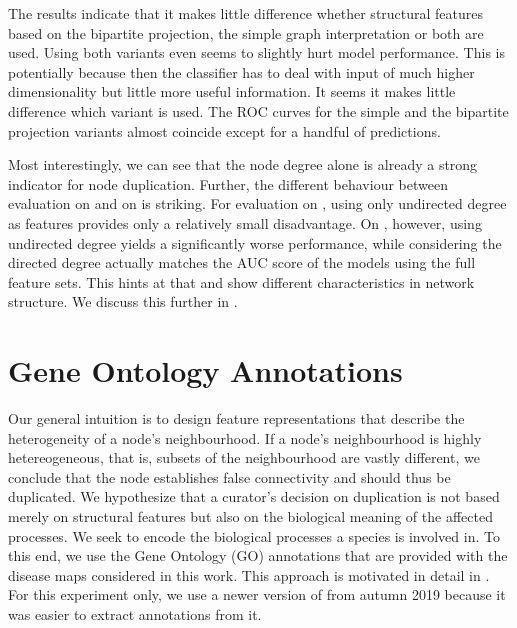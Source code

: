 \documentclass[
	fontsize=10pt, %
	twoside=true, %
	secnumdepth=1, %
  toc=indentunnumbered %
]{kaobook}
\begin{document}
The results indicate that it makes little difference whether structural features
based on the bipartite projection, the simple graph interpretation or both are
used. Using both variants even seems to slightly hurt model performance. This is
potentially because then the classifier has to deal with input of much higher
dimensionality but little more useful information.
%
It seems it makes little difference which variant is used. The ROC curves for the simple
and the bipartite projection variants almost coincide except for a handful of
predictions.

Most interestingly, we can see that the node degree alone is already a strong
indicator for node duplication. Further, the different behaviour between
evaluation on \PDMap{} and on \ReconMap{} is striking. 
For evaluation on \PDMap{}, using only undirected degree as
features provides only a relatively small disadvantage. On \ReconMap{}, however,
using undirected degree yields a significantly worse performance, while
considering the directed degree actually matches the AUC score of the models
using the full feature sets. This hints at that \PDMap{} and \ReconMap{} show
different characteristics in network structure. We discuss this further in
.

\section{Gene Ontology Annotations}
\label{sec:gene-ontology-annotations}





Our general intuition is to design feature representations that describe the
heterogeneity of a node's neighbourhood. If a node's neighbourhood is highly
hetereogeneous, that is, subsets of the neighbourhood are vastly different, we
conclude that the node establishes false connectivity and should thus be
duplicated. We hypothesize that a curator's decision on duplication is not based
merely on structural features but also on the biological meaning of the affected
processes. We seek to encode the biological processes a species is involved in.
To this end, we use the Gene Ontology (GO) annotations that are provided with
the disease maps considered in this work. This approach is motivated in detail
in . For this experiment only, we use a newer version of
\PDMap{} from autumn 2019 because it was easier to extract annotations from it.
\end{document}
